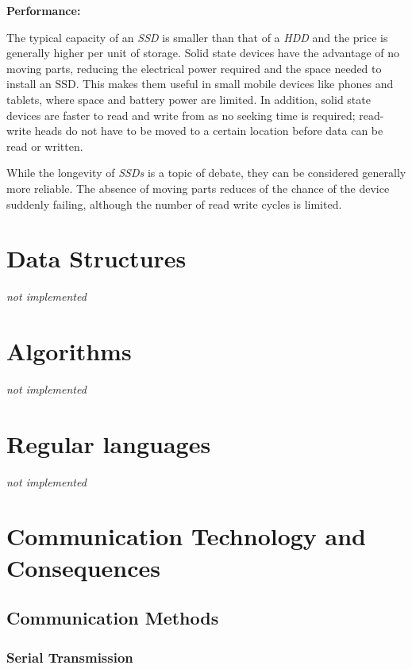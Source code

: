 \documentclass[9pt]{article}
\let\oldsection\section
\renewcommand\section{\clearpage\oldsection}
\begin{document}
\textbf{Performance:}

The typical capacity of an \emph{SSD} is smaller than that of a \emph{HDD} and the price is generally higher per unit of storage. Solid state devices have the advantage of no moving parts, reducing the electrical power required and the space needed to install an SSD. This makes them useful in small mobile devices like phones and tablets, where space and battery power are limited. In addition, solid state devices are faster to read and write from as no seeking time is required; read-write heads do not have to be moved to a certain location before data can be read or written.

While the longevity of \emph{SSDs} is a topic of debate, they can be considered generally more reliable. The absence of moving parts reduces of the chance of the device suddenly failing, although the number of read write cycles is limited.

\section{Data Structures}
\label{sec:org2b3e3c0}

\emph{not implemented}

\section{Algorithms}
\label{sec:orgb7fe2d2}

\emph{not implemented}

\section{Regular languages}
\label{sec:org0a973f3}

\emph{not implemented}

\section{Communication Technology and Consequences}
\label{sec:org2d052ff}
\subsection{Communication Methods}
\label{sec:org35bf0c2}
\subsubsection{Serial Transmission}
\label{sec:org7e1cbd0}
\end{document}
